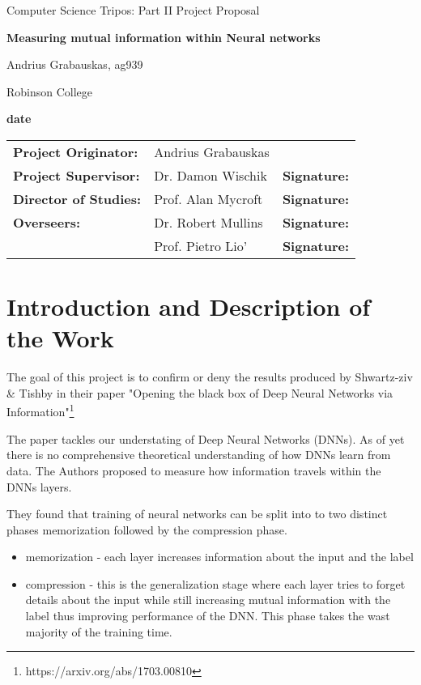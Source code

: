 \documentclass[12pt]{article}
\begin{document}
\thispagestyle{empty}

\centerline{\large Computer Science Tripos: Part II Project Proposal}
\vspace{0.4in}
\centerline{\Large\bf Measuring mutual information within Neural networks}
\vspace{0.3in}

\centerline{Andrius Grabauskas, ag939}
\centerline{Robinson College}

\centerline{\large \textbf{date}}

\vspace{1in}

\begin{tabular}{ p{4cm} p{4.5cm} l }
{\bf Project Originator:} & Andrius Grabauskas & \\[3mm]
{\bf Project Supervisor:} & Dr. Damon Wischik & {\bf Signature:} \\[3mm]
{\bf Director of Studies:} & Prof. Alan Mycroft & {\bf Signature:} \\[3mm]
{\bf Overseers:} & Dr. Robert Mullins & {\bf Signature:} \\[3mm]
                 & Prof. Pietro Lio' & {\bf Signature:} \\[3mm]
\end{tabular}

\vspace{0.75in}

\section*{Introduction and Description of the Work}

The goal of this project is to confirm or deny the results produced by
Shwartz-ziv \& Tishby in their paper "Opening the black box of Deep Neural
Networks via Information"\footnote{https://arxiv.org/abs/1703.00810}

The paper tackles our understating of Deep Neural Networks (DNNs). As of yet
there is no comprehensive theoretical understanding of how DNNs learn from data.
The Authors proposed to measure how information travels within the DNNs layers.

They found that training of neural networks can be split into to two distinct
phases memorization followed by the compression phase.
\begin{itemize}
  \item memorization - each layer increases information about the input and the
    label
  \item compression  - this is the generalization stage where each layer tries
    to forget details about the input while still increasing mutual information
    with the label thus improving performance of the DNN. This phase takes the
    wast majority of the training time.
\end{itemize}
\end{document}
